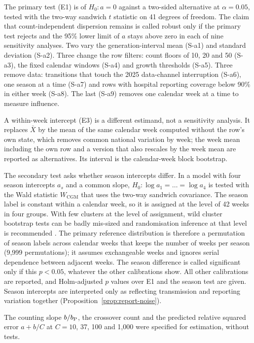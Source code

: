 The primary test (E1) is of $H_0\colon a=0$ against a two-sided alternative at $\alpha=0.05$, tested with the two-way sandwich $t$ statistic on 41 degrees of freedom. The claim that count-independent dispersion remains is called robust only if the primary test rejects and the 95\% lower limit of $a$ stays above zero in each of nine sensitivity analyses. Two vary the generation-interval mean (S-a1) and standard deviation (S-a2). Three change the row filters: count floors of 10, 20 and 50 (S-a3), the fixed calendar windows (S-a4) and growth thresholds (S-a5). Three remove data: transitions that touch the 2025 data-channel interruption (S-a6), one season at a time (S-a7) and rows with hospital reporting coverage below 90\% in either week (S-a8). The last (S-a9) removes one calendar week at a time to measure influence.

A within-week intercept (E3) is a different estimand, not a sensitivity analysis. It replaces $\bar X$ by the mean of the same calendar week computed without the row's own state, which removes common national variation by week; the week mean including the own row and a version that also rescales by the week mean are reported as alternatives. Its interval is the calendar-week block bootstrap.

The secondary test asks whether season intercepts differ. In a model with four season intercepts $a_s$ and a common slope, $H_0\colon\log a_1=\dots=\log a_4$ is tested with the Wald statistic $W_{\mathrm{CGM}}$ that uses the two-way sandwich covariance. The season label is constant within a calendar week, so it is assigned at the level of 42 weeks in four groups. With few clusters at the level of assignment, wild cluster bootstrap tests can be badly mis-sized and randomisation inference at that level is recommended \citep{mackinnon2018wild, mackinnon2023cluster}. The primary reference distribution is therefore a permutation of season labels across calendar weeks that keeps the number of weeks per season (9,999 permutations); it assumes exchangeable weeks and ignores serial dependence between adjacent weeks. The season difference is called significant only if this $p<0.05$, whatever the other calibrations show. All other calibrations are reported, and Holm-adjusted $p$ values over E1 and the season test are given. Season intercepts are interpreted only as reflecting transmission and reporting variation together (Proposition~\ref{prop:report-noise}).

The counting slope $b/b_{\mathrm P}$, the crossover count and the predicted relative squared error $a+b/C$ at $C=10$, 37, 100 and 1,000 were specified for estimation, without tests.

